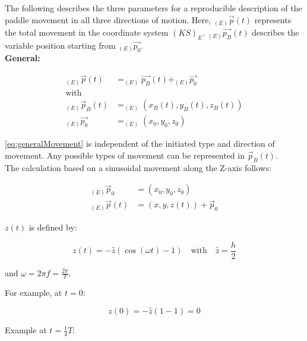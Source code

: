 \noindent The following describes the three parameters for a reproducible description of the paddle movement in all three directions of motion. Here, \( _{(E)}\vec{p}(t) \) represents the total movement in the coordinate system \((KS)_E\). \(_{(E)}\vec{p_B} (t) \) describes the variable position starting from \(_{(E)}\vec{p_0}\).\\

\textbf{General:}

\begin{equation}
    \begin{aligned}
        _{(E)}\vec{p}(t) &= _{(E)}\vec{p_B}(t) + _{(E)}\vec{p_0}\\
        \text{with}\\
        _{(E)}\vec{p}_B(t) &= _{(E)}\left(x_B(t), y_B(t), z_B(t)\right)\\
        _{(E)}\vec{p_0} &= _{(E)}\left(x_0, y_0, z_0\right)
    \end{aligned}
    \label{eq:generalMovement}
\end{equation}

\autoref{eq:generalMovement} is independent of the initiated type and direction of movement. Any possible types of movement can be represented in \(\vec{p}_B(t)\).\\

The calculation based on a sinusoidal movement along the Z-axis follows:

\begin{equation}
    \begin{aligned}
        _{(E)}\vec{p}_{0} &= (x_{0}, y_{0}, z_{0})\\
        _{(E)}\vec{p}(t) &= (x, y, z(t)) + \vec{p}_{0}  
    \end{aligned} 
\end{equation}

\( z(t) \) is defined by:

\begin{equation}
    z(t) = -\hat{z}(\cos(\omega t)-1)  \quad \text{with} \quad \hat{z} = \frac{h}{2}
\end{equation}

and \( \omega = 2 \pi f = \frac{2 \pi}{T} \).

For example, at \( t = 0 \):

\begin{equation}
    z(0) = -\hat{z}(1-1) = 0
\end{equation}

Example at \( t = \frac{1}{4}T \):

